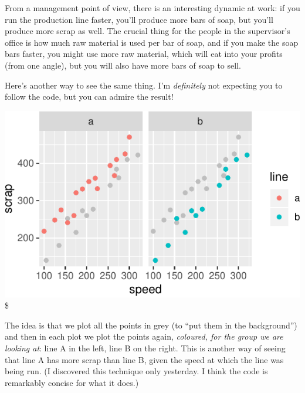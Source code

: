 \documentclass[]{tufte-book}
\newenvironment{Shaded}{}{}
\newcommand{\DataTypeTok}[1]{\textcolor[rgb]{0.56,0.13,0.00}{#1}}
\newcommand{\KeywordTok}[1]{\textcolor[rgb]{0.00,0.44,0.13}{\textbf{#1}}}
\newcommand{\NormalTok}[1]{#1}
\newcommand{\OperatorTok}[1]{\textcolor[rgb]{0.40,0.40,0.40}{#1}}
\newcommand{\StringTok}[1]{\textcolor[rgb]{0.25,0.44,0.63}{#1}}
\theoremstyle{definition}
\theoremstyle{definition}
\theoremstyle{definition}
\theoremstyle{remark}
\begin{document}
From a management point of view, there is an interesting dynamic at
work: if you run the production line faster, you'll produce more bars of
soap, but you'll produce more scrap as well. The crucial thing for the
people in the supervisor's office is how much raw material is used per
bar of soap, and if you make the soap bars faster, you might use more
raw material, which will eat into your profits (from one angle), but you
will also have more bars of soap to sell.

Here's another way to see the same thing. I'm \emph{definitely} not
expecting you to follow the code, but you can admire the result!

\begin{Shaded}
\end{Shaded}

\includegraphics{02-reading-in_files/figure-latex/unnamed-chunk-19-1} \$

The idea is that we plot all the points in grey (to ``put them in the
background'') and then in each plot we plot the points again,
\emph{coloured, for the group we are looking at}: line A in the left,
line B on the right. This is another way of seeing that line A has more
scrap than line B, given the speed at which the line was being run. (I
discovered this technique only yesterday. I think the code is remarkably
concise for what it does.)
\end{document}

